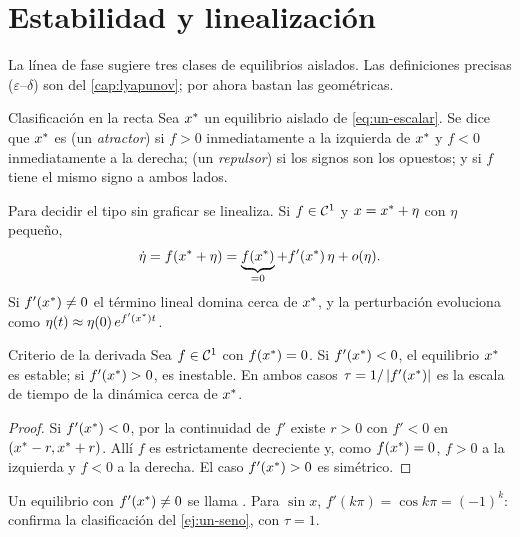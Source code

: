 \section{Estabilidad y linealización}
\label{sec:un-linealizacion}

La línea de fase sugiere tres clases de equilibrios aislados. Las definiciones precisas ($\varepsilon$--$\delta$) son del \cref{cap:lyapunov}; por ahora bastan las geométricas.

\begin{definicion}[label=def:un-clasificacion]{Clasificación en la recta}
Sea $x^{*}$ un equilibrio aislado de \eqref{eq:un-escalar}. Se dice que $x^{*}$ es  (un \emph{atractor}) si $f>0$ inmediatamente a la izquierda de $x^{*}$ y $f<0$ inmediatamente a la derecha;  (un \emph{repulsor}) si los signos son los opuestos; y  si $f$ tiene el mismo signo a ambos lados.
\end{definicion}

Para decidir el tipo sin graficar se linealiza. Si $f\in\mathcal{C}^{1}$ y $x=x^{*}+\eta$ con $\eta$ pequeño,
\[
  \dot\eta=f(x^{*}+\eta)=\underbrace{f(x^{*})}_{=0}+f'(x^{*})\,\eta+o(\eta) .
\]
Si $f'(x^{*})\neq0$ el término lineal domina cerca de $x^{*}$, y la perturbación evoluciona como $\eta(t)\approx\eta(0)\,e^{f'(x^{*})t}$.

\begin{proposicion}[label=prop:un-derivada]{Criterio de la derivada}
Sea $f\in\mathcal{C}^{1}$ con $f(x^{*})=0$. Si $f'(x^{*})<0$, el equilibrio $x^{*}$ es estable; si $f'(x^{*})>0$, es inestable. En ambos casos $\tau=1/\left\lvert f'(x^{*})\right\rvert$ es la escala de tiempo de la dinámica cerca de $x^{*}$.
\end{proposicion}

\begin{proof}
Si $f'(x^{*})<0$, por la continuidad de $f'$ existe $r>0$ con $f'<0$ en $(x^{*}-r,x^{*}+r)$. Allí $f$ es estrictamente decreciente y, como $f(x^{*})=0$, $f>0$ a la izquierda y $f<0$ a la derecha. El caso $f'(x^{*})>0$ es simétrico.
\end{proof}

Un equilibrio con $f'(x^{*})\neq0$ se llama . Para $\sin x$, $f'(k\pi)=\cos k\pi=(-1)^k$: confirma la clasificación del \cref{ej:un-seno}, con $\tau=1$.

